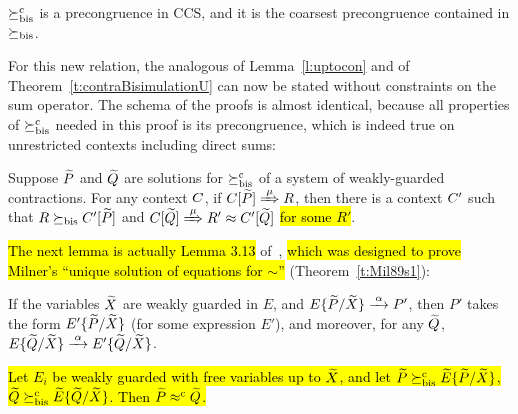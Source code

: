 \begin{theorem}
\label{t:rcontrPrecongruence}
$\mathrel{\succeq^{\rm{c}}_{\rm{bis}}}$ is a precongruence in CCS, and it is the coarsest
precongruence contained in $\mathrel{\succeq_{\rm{bis}}}$.
\end{theorem}  

For this new relation, the analogous of Lemma~\ref{l:uptocon} and of
Theorem~\ref{t:contraBisimulationU} can now be stated without
constraints on the sum operator.
The schema of the proofs is almost identical, because all 
properties of $\mathrel{\succeq^{\rm{c}}_{\rm{bis}}}$ needed in this proof is its precongruence, which is
indeed true on unrestricted contexts including direct sums:
\begin{lemma}
\label{l:ruptocon}
Suppose $\widetilde P$ and $\widetilde Q$ are solutions  for $\mathrel{\succeq^{\rm{c}}_{\rm{bis}}}$ 
 of a system of weakly-guarded contractions.
For any context $C$, 
if  $\ct{\til P}\Arr{\mu}  R$,
 then there is a context $C'$
such that $R \mathrel{\succeq_{\rm{bis}}} C' [\widetilde P]$ and  $\ct{\til Q} \Arr{\mu} R'
 \wb \ctp{\til Q}$ \hl{for some $R'$}.
\end{lemma}

\hl{The next lemma is actually Lemma 3.13} of~\citep[p.~102]{Mil89}, \hl{which
was designed to prove Milner's ``unique solution of equations for
$\sim$''} (Theorem~\ref{t:Mil89s1}):
\begin{lemma}
  \label{lem:milner313}
  If the variables ${\widetilde X}$ are weakly guarded in $E$, and $E\{\til
  P/\til X\} \arr{\alpha} P'$, then $P'$ takes the form $E'\{\widetilde
  P/\widetilde X\}$ (for some expression $E'$), and moreover, for any ${\widetilde Q}$,
  $E\{\til Q/\til X\} \arr{\alpha} E'\{\til Q/\til X\}$.
\end{lemma}

\begin{theorem}
\label{t:rcontraBisimulationU}
\hl{Let $E_i$ be weakly guarded with free variables up to $\widetilde X$,
and let $\widetilde P \mathrel{\succeq^{\rm{c}}_{\rm{bis}}} \widetilde E\{\widetilde P/\widetilde X\}$,
    $\widetilde Q \mathrel{\succeq^{\rm{c}}_{\rm{bis}}} \widetilde E\{\widetilde Q/\widetilde X\}$. Then $\widetilde P \mathrel{\approx^{\rm{c}}} \widetilde Q$.}
\end{theorem}

